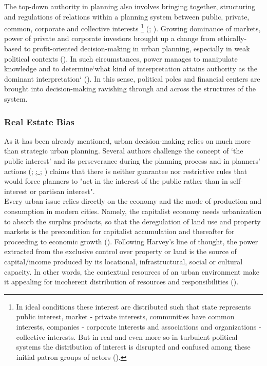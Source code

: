 \documentclass[11pt]{report}
\begin{document}
The top-down authority in planning also involves bringing together, structuring and regulations of relations within a planning system between public, private, common, corporate and collective interests
\footnote{In ideal conditions these interest are distributed such that state represents public interest, market - private interests, communities have common interests, companies - corporate interests and associations and organizations - collective interests.
But in real and even more so in turbulent political systems the distribution of interest is disrupted and confused among these initial patron groups of actors (\href{Vujosevic}{\citealt{vujosevic_regionalizam_2015}}).}
(\href{Maksic}{\citealt{maksic_european_2012}}; \href{Vujosevic}{\citealt{vujosevic_regionalizam_2015}}).
Growing dominance of markets, power of private and corporate investors brought up a change from ethically-based to profit-oriented decision-making in urban planning, especially in weak political contexts (\href{Lazarevic}{\citealt{bajec_rational_2009}}).
In such circumstances, power manages to manipulate knowledge and to determine`what kind of interpretation attains authority as the dominant interpretation` (\href{Getimis}{\citealt{getimis_comparing_2012}}).
In this sense, political poles and financial centers are brought into decision-making ravishing through and across the structures of the system.

\subsubsection{Real Estate Bias}

As it has been already mentioned, urban decision-making relies on much more than strategic urban planning.
Several authors challenge the concept of ‘the public interest’ and its perseverance during the planning process and in planners' actions
(\href{Alexander}{\citealt{alexander_XXX_2002}};
\href{Campbell}{{\citealt{campbel_XXX_2012}};
\href{Moroni}{\citealt{moroni_XXXX_2004}}};
\href{Sager}{\citealt{sager_logic_2006}})
\href{Sager}{\cite{sager_logic_2006}} claims that there is neither guarantee nor restrictive rules that would force planners to "act in the interest of the public rather than in self-interest or partisan interest".
\\

Every urban issue relies directly on the economy  and  the  mode  of  production  and  consumption  in  modern  cities.  Namely,  the  capitalist  economy  needs urbanization to absorb the surplus products, so that the deregulation of land use and property markets is the precondition for capitalist accumulation and thereafter for proceeding to economic growth (\href{Harvey}{\citealt{harvey_rebel_2012}}).
Following Harvey’s line of thought, the power  extracted  from  the  exclusive  control  over  property  or  land  is  the  source  of  capital/income  produced  by  its  locational, infrastructural, social or cultural capacity.
In other words, the contextual resources of an urban environment make it appealing for incoherent distribution of resources and responsibilities (\href{Bolay}{\citealt{bolay_urban_2005}}).
\\
\end{document}
